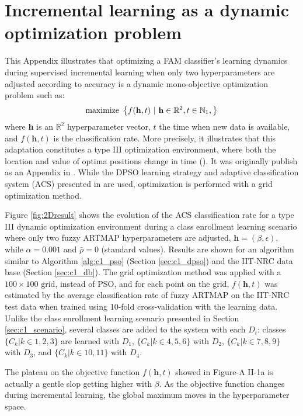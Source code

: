 \chapter{Incremental learning as a dynamic {optimization problem}}
\label{sec:c1_2Dresult}

This Appendix illustrates that optimizing a FAM classifier's learning dynamics during supervised incremental learning when only two hyperparameters are adjusted according to accuracy is a dynamic mono-objective optimization problem such as:
\begin{equation}
	\textnormal{maximize }\left\{ f(\textbf{h},t)\ |\ \textbf{h}\in\mathbb{R}^2,
															 t\in\mathbb{N}_1, \right\}
\end{equation}
where \textbf{h} is an $\mathbb{R}^2$ hyperparameter vector, $t$ the time when new data is available, and $f(\textbf{h},t)$ is the classification rate.
More precisely, it illustrates that this adaptation constitutes a type III optimization environment, where both the location and value of optima positions change in time (\cite{engelbrecht05}).
It was originally publish as an Appendix in \cite{connolly10}.
While the DPSO learning strategy and adaptive classification system (ACS) presented in \cite{connolly10} are used, optimization is performed with a grid optimization method. 

Figure \ref{fig:2Dresult} shows the evolution of the ACS classification rate for a type III dynamic optimization environment during a class enrollment learning scenario where only two fuzzy ARTMAP hyperparameters are adjusted, $\textbf{h}=(\beta, \epsilon)$, while $\alpha=0.001$ and $\bar{\rho}=0$ (standard values). Results are shown for an algorithm similar to Algorithm \ref{alg:c1_pso} (Section \ref{sec:c1_dpso}) and the IIT-NRC data base (Section \ref{sec:c1_db}). The grid optimization method was applied with a $100\times100$ grid, instead of PSO, and for each point on the grid, $f(\textbf{h},t)$ was estimated by the average classification rate of fuzzy ARTMAP on the IIT-NRC test data when trained using 10-fold cross-validation with the learning data. Unlike the class enrollment learning scenario presented in Section \ref{sec:c1_scenario}, several classes are added to the system with each $D_t$: classes $\{C_k|k\in1,2,3\}$ are learned with $D_1$, $\{C_k|k\in4,5,6\}$ with $D_2$, $\{C_k|k\in7,8,9\}$ with $D_3$, and $\{C_k|k\in10,11\}$ with $D_4$.

The plateau on the objective function $f(\textbf{h},t)$ showed in Figure-A II-1a is actually a gentle slop getting higher with $\beta$. As the objective function changes during incremental learning, the global maximum moves in the hyperparameter space.

